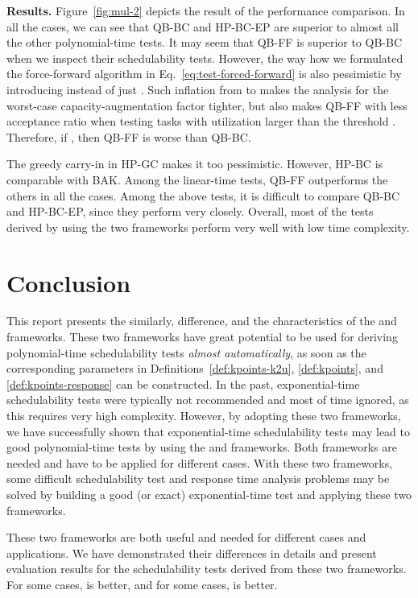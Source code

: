 \documentclass[10pt,conference]{IEEEtran}
\newcommand{\frameworkkq}[1]{}
\newcommand{\frameworkku}[1]{}
\begin{document}
{\noindent \bf Results.}
Figure~\ref{fig:mul-2} depicts the result of the performance comparison. In all the cases, we can see that QB-BC and HP-BC-EP are superior to almost all the other polynomial-time tests.  It may seem that QB-FF is superior to QB-BC when we inspect their schedulability tests. However, the way how we formulated the force-forward algorithm in Eq.~\eqref{eq:test-forced-forward} is also pessimistic by introducing  instead of just . Such inflation from  to  makes the analysis for the worst-case capacity-augmentation factor tighter, but also makes QB-FF with less acceptance ratio when testing tasks with utilization larger than the threshold . Therefore, if , then QB-FF is worse than QB-BC.

The greedy carry-in in HP-GC makes it too pessimistic. However, HP-BC is comparable with BAK. Among the linear-time tests, QB-FF outperforms the others in all the cases. Among the above tests, it is difficult to compare QB-BC and HP-BC-EP, since they perform very closely.  Overall, most of the tests derived by using the two frameworks perform very well with low time complexity.


\section{Conclusion}

This report presents the similarly, difference, and the
characteristics of the \frameworkku{} and \frameworkkq{}
frameworks. These two frameworks have great potential to be used for
deriving polynomial-time schedulability tests \emph{almost automatically}, as soon as
the corresponding parameters in Definitions~\ref{def:kpoints-k2u},
\ref{def:kpoints}, and \ref{def:kpoints-response} can be constructed.
In the past, exponential-time schedulability tests were typically not
recommended and most of time ignored, as this requires very high
complexity. However, by adopting these two frameworks, we have
successfully shown that exponential-time schedulability tests may lead
to good polynomial-time tests by using the \frameworkku{} and
\frameworkkq{} frameworks. Both frameworks are needed and have to be
applied for different cases. With these two frameworks, some difficult
schedulability test and response time analysis problems may be solved
by building a good (or exact) exponential-time test and applying these
two frameworks.

These two frameworks are both useful and needed for different cases
and applications. We have demonstrated their differences in details
and present evaluation results for the schedulability tests derived
from these two frameworks. For some cases, \frameworkku{} is better,
and for some cases, \frameworkkq{} is better.
\end{document}

